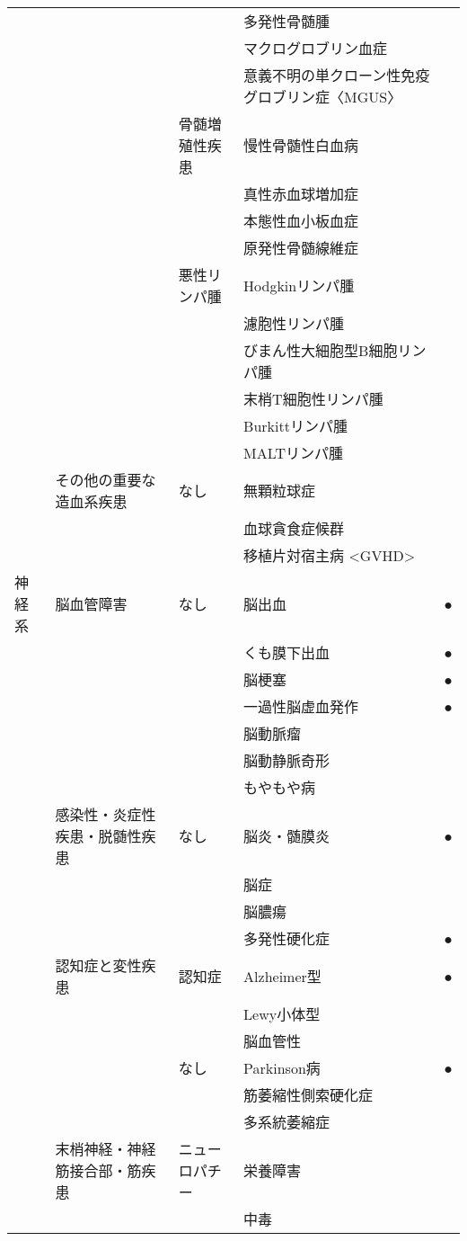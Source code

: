 \begin{xltabular}{\linewidth}{XXXXX}
 &  &  & 多発性骨髄腫 &  \\
 &  &  & マクログロブリン血症 &  \\
 &  &  & 意義不明の単クローン性免疫グロブリン症〈MGUS〉 &  \\
 &  & 骨髄増殖性疾患 & 慢性骨髄性白血病 &  \\
 &  &  & 真性赤血球増加症 &  \\
 &  &  & 本態性血小板血症 &  \\
 &  &  & 原発性骨髄線維症 &  \\
 &  & 悪性リンパ腫 & Hodgkinリンパ腫 &  \\
 &  &  & 濾胞性リンパ腫 &  \\
 &  &  & びまん性大細胞型B細胞リンパ腫 &  \\
 &  &  & 末梢T細胞性リンパ腫 &  \\
 &  &  & Burkittリンパ腫 &  \\
 &  &  & MALTリンパ腫 &  \\
 & その他の重要な造血系疾患 & なし & 無顆粒球症 &  \\
 &  &  & 血球貪食症候群 &  \\
 &  &  & 移植片対宿主病 <GVHD> &  \\
神経系 & 脳血管障害 & なし & 脳出血 & ● \\
 &  &  & くも膜下出血 & ● \\
 &  &  & 脳梗塞 & ● \\
 &  &  & 一過性脳虚血発作 & ● \\
 &  &  & 脳動脈瘤 &  \\
 &  &  & 脳動静脈奇形 &  \\
 &  &  & もやもや病 &  \\
 & 感染性・炎症性疾患・脱髄性疾患 & なし & 脳炎・髄膜炎 & ● \\
 &  &  & 脳症 &  \\
 &  &  & 脳膿瘍 &  \\
 &  &  & 多発性硬化症 & ● \\
 & 認知症と変性疾患 & 認知症 & Alzheimer型 & ● \\
 &  &  & Lewy小体型 &  \\
 &  &  & 脳血管性 &  \\
 &  & なし & Parkinson病 & ● \\
 &  &  & 筋萎縮性側索硬化症 &  \\
 &  &  & 多系統萎縮症 &  \\
 & 末梢神経・神経 筋接合部・筋疾患 & ニューロパチー & 栄養障害 &  \\
 &  &  & 中毒 &  \\

\end{xltabular}
